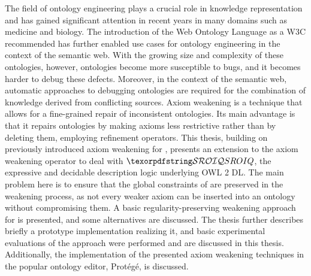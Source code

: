 
The field of ontology engineering plays a crucial role in knowledge representation and has gained significant attention in recent years in many domains such as medicine and biology. The introduction of the Web Ontology Language as a W3C recommended has further enabled use cases for ontology engineering in the context of the semantic web. With the growing size and complexity of these ontologies, however, ontologies become more susceptible to bugs, and it becomes harder to debug these defects. Moreover, in the context of the semantic web, automatic approaches to debugging ontologies are required for the combination of knowledge derived from conflicting sources. Axiom weakening is a technique that allows for a fine-grained repair of inconsistent ontologies. Its main advantage is that it repairs ontologies by making axioms less restrictive rather than by deleting them, employing refinement operators. This thesis, building on previously introduced axiom weakening for \ALC, presents an extension to the axiom weakening operator to deal with $\SROIQ$, the expressive and decidable description logic underlying OWL 2 DL. The main problem here is to ensure that the global constraints of \SROIQ are preserved in the weakening process, as not every weaker axiom can be inserted into an ontology without compromising them. A basic regularity-preserving weakening approach for \SROIQ is presented, and some alternatives are discussed. The thesis further describes briefly a prototype implementation realizing it, and basic experimental evaluations of the approach were performed and are discussed in this thesis. Additionally, the implementation of the presented axiom weakening techniques in the popular ontology editor, Protégé, is discussed.

